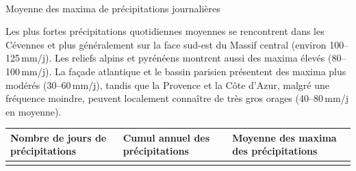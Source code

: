 \documentclass[
  article,
  nofooter,
  noheadings]{jss}
\makeatletter
\let\oldparagraph\paragraph
\renewcommand{\paragraph}{
    \@ifstar
      \xxxParagraphStar
      \xxxParagraphNoStar
  }
\newcommand{\xxxParagraphStar}[1]{\oldparagraph*{#1}\mbox{}}
\newcommand{\xxxParagraphNoStar}[1]{\oldparagraph{#1}\mbox{}}
\makeatother
\begin{document}
\paragraph{Moyenne des maxima de précipitations
journalières}\label{moyenne-des-maxima-de-pruxe9cipitations-journaliuxe8res}

Les plus fortes précipitations quotidiennes moyennes se rencontrent dans
les Cévennes et plus généralement sur la face sud-est du Massif central
(environ 100--125\,mm/j). Les reliefs alpins et pyrénéens montrent aussi
des maxima élevés (80--100\,mm/j). La façade atlantique et le bassin
parisien présentent des maxima plus modérés (30--60\,mm/j), tandis que
la Provence et la Côte d'Azur, malgré une fréquence moindre, peuvent
localement connaître de très gros orages (40--80\,mm/j en moyenne).

\begin{longtable}[]{@{}
  >{\centering\arraybackslash}p{}
  >{\centering\arraybackslash}p{}
  >{\centering\arraybackslash}p{}@{}}
\toprule\noalign{}
\begin{minipage}[b]{\linewidth}\centering
\small Nombre de jours de précipitations
\end{minipage} & \begin{minipage}[b]{\linewidth}\centering
\small Cumul annuel des précipitations
\end{minipage} & \begin{minipage}[b]{\linewidth}\centering
\small Moyenne des maxima des précipitations
\end{minipage} \\
\midrule\noalign{}
\endhead
\bottomrule\noalign{}
\endlastfoot

\end{longtable}
\end{document}
